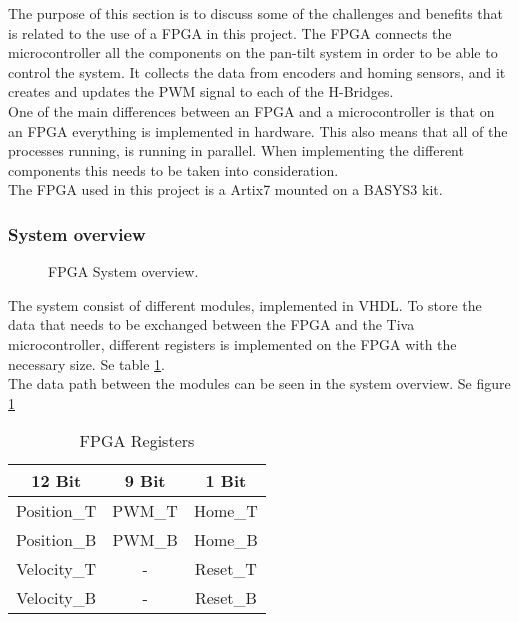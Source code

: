 \documentclass[../../../main]{subfiles}
\begin{document}
The purpose of this section is to discuss some of the challenges and benefits that is related to the use of a FPGA in this project.
The FPGA connects the  microcontroller all the components on the pan-tilt system in order to be able to control the system. It collects the data from encoders and homing sensors, and it creates and updates the PWM signal to each of the H-Bridges.
\\
One of the main differences between an FPGA and a microcontroller is that on an FPGA everything is implemented in hardware. This also means that all of the processes running, is running in parallel. When implementing the different components this needs to be taken into consideration.
\\
The FPGA used in this project is a Artix7 mounted on a BASYS3 kit. 
\subsubsection{System overview}%
\label{sub:system_overview}

\begin{figure}[H]
  \centering
  \def\svgwidth{\textwidth}
  
  \caption{FPGA System overview.}
  \label{fig:FPGA_system_overview}
\end{figure}

The system consist of different modules, implemented in VHDL.
To store the data that needs to be exchanged between the FPGA and the Tiva microcontroller, different registers is implemented on the FPGA with the necessary size. Se table \ref{table:FPGA_registers}.
\\
The data path between the modules can be seen in the system overview. Se figure \ref{fig:FPGA_system_overview}
\begin{table}[H]
\centering
\begin{tabular}{|c|c|c|}
\hline
\textbf{12 Bit} & \textbf{9 Bit} & \textbf{1 Bit} \\ \hline
Position\_T     & PWM\_T         & Home\_T        \\ \hline
Position\_B     & PWM\_B         & Home\_B        \\ \hline
Velocity\_T     & -              & Reset\_T       \\ \hline
Velocity\_B     & -              & Reset\_B       \\ \hline
\end{tabular}
\caption{FPGA Registers}
\label{table:FPGA_registers}
\end{table}
\end{document}
